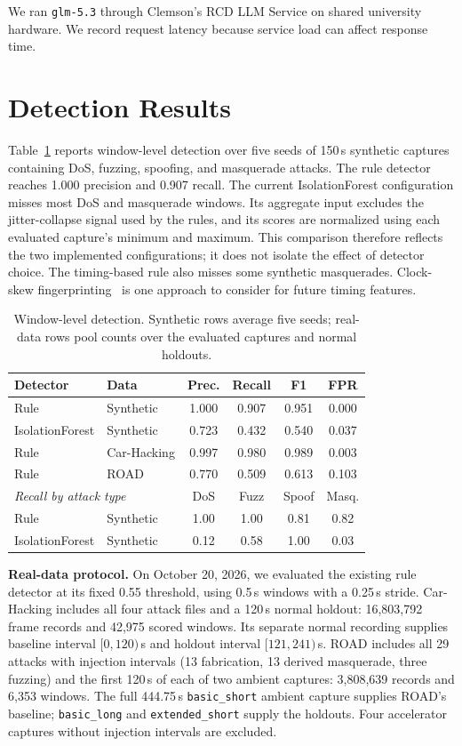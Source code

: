 \documentclass[sigconf]{acmart}
\begin{document}
We ran \texttt{glm-5.3} through Clemson's RCD LLM Service on shared university hardware. We record request latency because service load can affect response time.

\section{Detection Results}\label{sec:detect}
Table~\ref{tab:results} reports window-level detection over five seeds of 150\,s synthetic captures containing DoS, fuzzing, spoofing, and masquerade attacks. The rule detector reaches 1.000 precision and 0.907 recall. The current IsolationForest configuration misses most DoS and masquerade windows. Its aggregate input excludes the jitter-collapse signal used by the rules, and its scores are normalized using each evaluated capture's minimum and maximum. This comparison therefore reflects the two implemented configurations; it does not isolate the effect of detector choice. The timing-based rule also misses some synthetic masquerades. Clock-skew fingerprinting~\cite{cho2016cids} is one approach to consider for future timing features.

\begin{table}[t]
  \caption{Window-level detection. Synthetic rows average five seeds; real-data rows pool counts over the evaluated captures and normal holdouts.}
  \label{tab:results}
  \small
  \begin{tabular}{llcccc}
    \toprule
    Detector & Data & Prec. & Recall & F1 & FPR \\
    \midrule
    Rule & Synthetic & 1.000 & 0.907 & 0.951 & 0.000 \\
    IsolationForest & Synthetic & 0.723 & 0.432 & 0.540 & 0.037 \\
    Rule & Car-Hacking & 0.997 & 0.980 & 0.989 & 0.003 \\
    Rule & ROAD & 0.770 & 0.509 & 0.613 & 0.103 \\
    \midrule
    \multicolumn{2}{l}{\emph{Recall by attack type}} & DoS & Fuzz & Spoof & Masq. \\
    \midrule
    Rule & Synthetic & 1.00 & 1.00 & 0.81 & 0.82 \\
    IsolationForest & Synthetic & 0.12 & 0.58 & 1.00 & 0.03 \\
    \bottomrule
  \end{tabular}
\end{table}

\textbf{Real-data protocol.} On October 20, 2026, we evaluated the existing rule detector at its fixed 0.55 threshold, using 0.5\,s windows with a 0.25\,s stride. Car-Hacking includes all four attack files and a 120\,s normal holdout: 16,803,792 frame records and 42,975 scored windows. Its separate normal recording supplies baseline interval $[0,120)$\,s and holdout interval $[121,241)$\,s. ROAD includes all 29 attacks with injection intervals (13 fabrication, 13 derived masquerade, three fuzzing) and the first 120\,s of each of two ambient captures: 3,808,639 records and 6,353 windows. The full 444.75\,s \texttt{basic\_short} ambient capture supplies ROAD's baseline; \texttt{basic\_long} and \texttt{extended\_short} supply the holdouts. Four accelerator captures without injection intervals are excluded.
\end{document}
